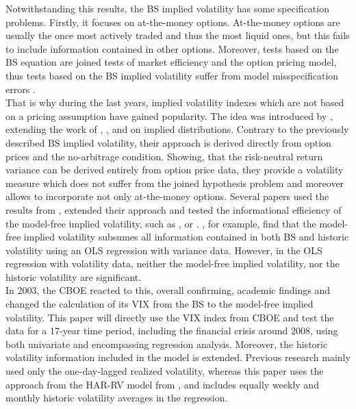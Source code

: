 Notwithstanding this results, the \ac{BS} implied volatility has some specification problems. Firstly, it focuses on at-the-money options. At-the-money options are usually the once most actively traded and thus the most liquid ones, but this fails to include information contained in other options. Moreover, tests based on the \ac{BS} equation are joined tests of market efficiency and the option pricing model, thus tests based on the \ac{BS} implied volatility suffer from model misspecification errors \parencite{jiang2003}. \\
That is why during the last years, implied volatility indexes which are not based on a pricing assumption have gained popularity. The idea was introduced by \textcite{britten2000}, extending the work of \textcite{derman1994}, \textcite{dupire1994}, \textcite{dupire1997} and \textcite{rubinstein1994} on implied distributions. Contrary to the previously described \ac{BS} implied volatility, their approach is derived directly from option prices and the no-arbitrage condition. Showing, that the risk-neutral return variance can be derived entirely from option price data, they provide a volatility measure which does not suffer from the joined hypothesis problem and moreover allows to incorporate not only at-the-money options.
Several papers used the results from \textcite{britten2000}, extended their approach and tested the informational efficiency of the model-free implied volatility, such as \textcite{bakanova2010}, \textcite{taylor2010} or \textcite{jiang2003}. \textcite{jiang2003}, for example, find that the model-free implied volatility subsumes all information contained in both \ac{BS} and historic volatility using an OLS regression with variance data. However, in the OLS regression with volatility data, neither the model-free implied volatility, nor the historic volatility are significant.\\
In 2003, the \ac{CBOE} reacted to this, overall confirming, academic findings and changed the calculation of its \ac{VIX} from the \ac{BS} to the model-free implied volatility. This paper will directly use the \ac{VIX} index from \ac{CBOE} and test the data for a 17-year time period, including the financial crisis around 2008, using both univariate and encompassing regression analysis. Moreover, the historic volatility information included in the model is extended. Previous research mainly used only the one-day-lagged realized volatility, whereas this paper uses the approach from the HAR-RV model from \textcite{corsi2009}, and includes equally weekly and monthly historic volatility averages in the regression. 






